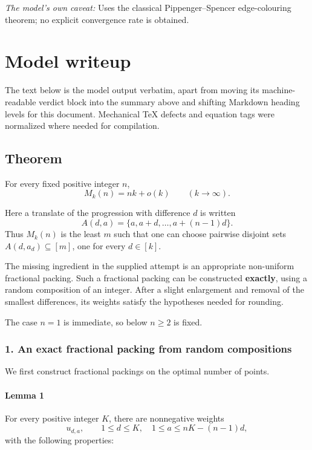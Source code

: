 \documentclass[
  11pt,
  a4paper,
]{article}
\begin{document}
\emph{The model's own caveat:} Uses the classical Pippenger--Spencer
edge-colouring theorem; no explicit convergence rate is obtained.

\section{Model writeup}\label{model-writeup}

The text below is the model output verbatim, apart from moving its
machine-readable verdict block into the summary above and shifting
Markdown heading levels for this document. Mechanical TeX defects and
equation tags were normalized where needed for compilation.

\subsection{Theorem}\label{theorem}

For every fixed positive integer \(n\), \[
M_k(n)=nk+o(k)\qquad(k\to\infty).
\]

Here a translate of the progression with difference \(d\) is written \[
A(d,a)=\{a,a+d,\ldots,a+(n-1)d\}.
\] Thus \(M_k(n)\) is the least \(m\) such that one can choose pairwise
disjoint sets \(A(d,a_d)\subseteq[m]\), one for every \(d\in[k]\).

The missing ingredient in the supplied attempt is an appropriate
non-uniform fractional packing. Such a fractional packing can be
constructed \textbf{exactly}, using a random composition of an integer.
After a slight enlargement and removal of the smallest differences, its
weights satisfy the hypotheses needed for rounding.

The case \(n=1\) is immediate, so below \(n\ge2\) is fixed.

\subsubsection{1. An exact fractional packing from random
compositions}\label{an-exact-fractional-packing-from-random-compositions}

We first construct fractional packings on the optimal number of points.

\paragraph{Lemma 1}\label{lemma-1}

For every positive integer \(K\), there are nonnegative weights \[
u_{d,a},
\qquad
1\le d\le K,\quad 1\le a\le nK-(n-1)d,
\] with the following properties:
\end{document}
